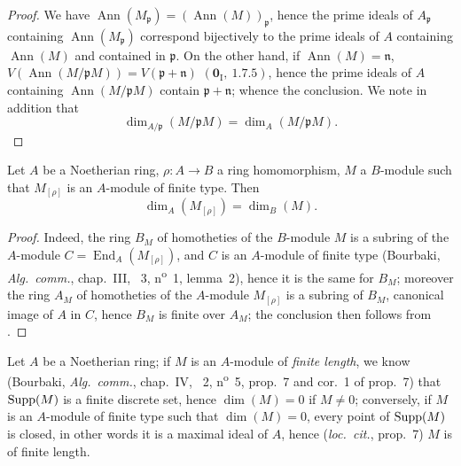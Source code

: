 \begin{proof}
We have $\operatorname{Ann}(M_\mathfrak{p})=(\operatorname{Ann}(M))_\mathfrak{p}$, hence the prime ideals of $A_\mathfrak{p}$ containing $\operatorname{Ann}(M_\mathfrak{p})$ correspond bijectively to the prime ideals of $A$ containing $\operatorname{Ann}(M)$ and contained in $\mathfrak{p}$.
On the other hand, if $\operatorname{Ann}(M)=\mathfrak{n}$, $V(\operatorname{Ann}(M/\mathfrak{p}M))=V(\mathfrak{p}+\mathfrak{n})$ $(\mathbf{0}_\mathrm{I},~1.7.5)$, hence the prime ideals of $A$ containing $\operatorname{Ann}(M/\mathfrak{p}M)$ contain $\mathfrak{p}+\mathfrak{n}$; whence the conclusion.
We note in addition that
\begin{equation}
\label{0.16.1.8.2}
\tag{16.1.8.2}
  \dim_{A/\mathfrak{p}}(M/\mathfrak{p}M)=\dim_A(M/\mathfrak{p}M).
\end{equation}
\end{proof}

\begin{proposition}[16.1.9]
\label{0.16.1.9}
Let $A$ be a Noetherian ring, $\rho:A\to B$ a ring homomorphism, $M$ a $B$-module such that $M_{[\rho]}$ is an $A$-module of finite type.
Then
\begin{equation}
\label{0.16.1.9.1}
\tag{16.1.9.1}
  \dim_A(M_{[\rho]})=\dim_B(M).
\end{equation}
\end{proposition}

\begin{proof}
Indeed, the ring $B_M$ of homotheties of the $B$-module $M$ is a subring of the $A$-module $C=\operatorname{End}_A(M_{[\rho]})$, and $C$ is an $A$-module of finite type (Bourbaki, \emph{Alg.~comm.}, chap.~III, \textsection~3, n\textsuperscript{o}~1, lemma~2), hence it is the same for $B_M$; moreover the ring $A_M$ of homotheties of the $A$-module $M_{[\rho]}$ is a subring of $B_M$, canonical image of $A$ in $C$, hence $B_M$ is finite over $A_M$; the conclusion then follows from .
\end{proof}

\begin{env}[16.1.10]
\label{0.16.1.10}
Let $A$ be a Noetherian ring; if $M$ is an $A$-module of \emph{finite length}, we know (Bourbaki, \emph{Alg.~comm.}, chap.~IV, \textsection~2, n\textsuperscript{o}~5, prop.~7 and cor.~1 of prop.~7) that $\operatorname{Supp}(M)$ is a finite discrete set, hence $\dim(M)=0$ if $M\neq 0$; conversely, if $M$ is an $A$-module of finite type such that $\dim(M)=0$, every point of $\operatorname{Supp}(M)$ is closed, in other words it is a maximal ideal of $A$, hence (\emph{loc.~cit.}, prop.~7) $M$ is of finite length.
\end{env}

